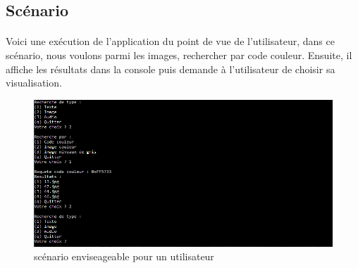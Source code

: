 \documentclass[../main.tex]{subfiles}
\begin{document}
    \subsection{Scénario}
    \paragraph{}
    Voici une exécution de l’application du point de vue de l’utilisateur, dans ce scénario, nous voulons parmi les images, rechercher par code couleur. Ensuite, il affiche les résultats dans la console puis demande à l'utilisateur de choisir sa visualisation.

    \begin{figure}[h]
        \centering
        \includegraphics[width=160mm]{use_cases/scenario utilisateur.PNG}
        \caption{scénario enviseageable pour un utilisateur}
    \end{figure}
\end{document}
